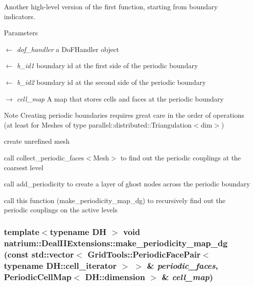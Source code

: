 Another high-\/level version of the first function, starting from boundary indicators. 
\begin{DoxyParams}{Parameters}
\item[\mbox{$\leftarrow$} {\em dof\_\-handler}]a DoFHandler object \item[\mbox{$\leftarrow$} {\em b\_\-id1}]boundary id at the first side of the periodic boundary \item[\mbox{$\leftarrow$} {\em b\_\-id2}]boundary id at the second side of the periodic boundary \item[\mbox{$\rightarrow$} {\em cell\_\-map}]A map that stores cells and faces at the periodic boundary \end{DoxyParams}
\begin{DoxyNote}{Note}
Creating periodic boundaries requires great care in the order of operations (at least for Meshes of type parallel::distributed::Triangulation$<$dim$>$)
\begin{DoxyEnumerate}
\item create unrefined mesh
\item call collect\_\-periodic\_\-faces$<$Mesh$>$ to find out the periodic couplings at the coarsest level
\item call add\_\-periodicity to create a layer of ghost nodes across the periodic boundary
\item call this function (make\_\-periodicity\_\-map\_\-dg) to recursively find out the periodic couplings on the active levels 
\end{DoxyEnumerate}
\end{DoxyNote}
\hypertarget{namespacenatrium_1_1DealIIExtensions_a02ccc2d5be9d7550b75fa196aeb71656}{
\subsubsection[{make\_\-periodicity\_\-map\_\-dg}]{\setlength{\rightskip}{0pt plus 5cm}template$<$typename DH $>$ void natrium::DealIIExtensions::make\_\-periodicity\_\-map\_\-dg (const std::vector$<$ GridTools::PeriodicFacePair$<$ typename DH::cell\_\-iterator $>$ $>$ \& {\em periodic\_\-faces}, \/  PeriodicCellMap$<$ DH::dimension $>$ \& {\em cell\_\-map})}}
\label{namespacenatrium_1_1DealIIExtensions_a02ccc2d5be9d7550b75fa196aeb71656}


